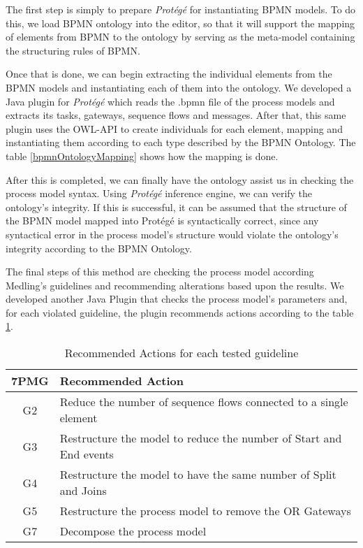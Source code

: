 \documentclass[a4paper,twoside]{article}
\begin{document}
The first step is simply to prepare \textit{Protégé} for instantiating BPMN models. To do this, we load BPMN ontology into the editor, so that it will support the mapping of elements from BPMN to the ontology by serving as the meta-model containing the structuring rules of BPMN.

Once that is done, we can begin extracting the individual elements from the BPMN models and instantiating each of them into the ontology. We developed a Java plugin for \textit{Protégé} which reads the .bpmn file of the process models and extracts its tasks, gateways, sequence flows and messages. After that, this same plugin uses the OWL-API to create individuals for each element, mapping and instantiating them according to each type described by the BPMN Ontology. The table \ref{bpmnOntologyMapping} shows how the mapping is done.

After this is completed, we can finally have the ontology assist us in checking the process model syntax.  Using \textit{Protégé} inference engine, we can verify the ontology's integrity. If this is successful, it can be assumed that the structure of the BPMN model mapped into Protégé is syntactically correct, since any syntactical error in the process model's structure would violate the ontology's integrity according to the BPMN Ontology.

The final steps of this method are checking the process model according Medling's guidelines and recommending alterations based upon the results. We developed another Java Plugin that checks the process model's parameters and, for each violated guideline, the plugin recommends actions according to the table \ref{RecommendedActions}.

\begin{table}[]
	\centering
	\caption{Recommended Actions for each tested guideline}
	\label{RecommendedActions}
	\begin{tabular}{|c|p{5.5cm}|}
		\hline
		7PMG & Recommended Action \\ \hline
		G2 & Reduce the number of sequence flows connected to a single element \\ \hline
		G3 & Restructure the model to reduce the number of Start and End events \\ \hline
		G4 & Restructure the model to have the same number of Split and Joins \\ \hline
		G5 & Restructure the process model to remove the OR Gateways \\ \hline
		G7 & Decompose the process model \\ \hline
	\end{tabular}
\end{table}
\end{document}
